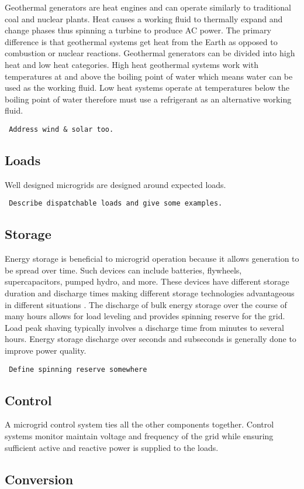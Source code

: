 Geothermal generators are heat engines and can operate similarly to traditional coal and nuclear plants. Heat causes a working fluid to thermally expand and change phases thus spinning a turbine to produce AC power. The primary difference is that geothermal systems get heat from the Earth as opposed to combustion or nuclear reactions. Geothermal generators can be divided into high heat and low heat categories. High heat geothermal systems work with temperatures at and above the boiling point of water which means water can be used as the working fluid. Low heat systems operate at temperatures below the boiling point of water therefore must use a refrigerant as an alternative working fluid. 

\begin{verbatim} 
 Address wind & solar too.
\end{verbatim}

\subsection{Loads}
Well designed microgrids are designed around expected loads. 
\begin{verbatim} 
 Describe dispatchable loads and give some examples. 
\end{verbatim}

\subsection{Storage}
Energy storage is beneficial to microgrid operation because it allows generation to be spread over time. Such devices can include batteries, flywheels, supercapacitors, pumped hydro, and more. These devices have different storage duration and discharge times making different storage technologies advantageous in different situations \cite{Schoenung2003}. The discharge of bulk energy storage over the course of many hours allows for load leveling and provides spinning reserve for the grid. Load peak shaving typically involves a discharge time from minutes to several hours. Energy storage discharge over seconds and subseconds is generally done to improve power quality.
\begin{verbatim}
 Define spinning reserve somewhere
\end{verbatim}

\subsection{Control}
A microgrid control system ties all the other components together. Control systems monitor maintain voltage and frequency of the grid while ensuring sufficient active and reactive power is supplied to the loads.

\subsection{Conversion}

